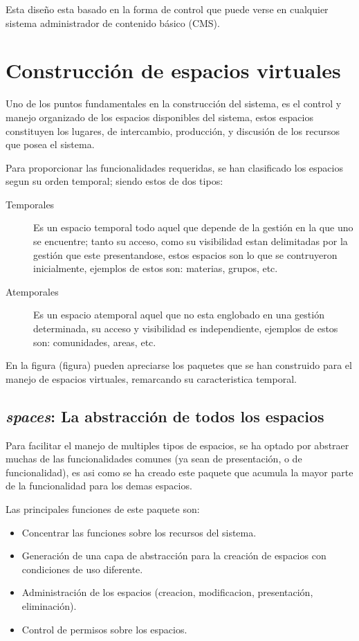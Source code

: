 Esta diseño esta basado en la forma de control que puede verse en cualquier
sistema administrador de contenido básico (CMS).

\section{Construcción de espacios virtuales}
Uno de los puntos fundamentales en la construcción del sistema, es el control y
manejo organizado de los espacios disponibles del sistema, estos espacios
constituyen los lugares, de intercambio, producción, y discusión de los
recursos que posea el sistema.

Para proporcionar las funcionalidades requeridas, se han clasificado los
espacios segun su orden temporal; siendo estos de dos tipos:

\begin{description}
\item [Temporales] Es un espacio temporal todo aquel que depende de la gestión
en la que uno se encuentre; tanto su acceso, como su visibilidad estan
delimitadas por la gestión que este presentandose, estos espacios son lo que se
contruyeron inicialmente, ejemplos de estos son: materias, grupos, etc.
\item [Atemporales] Es un espacio atemporal aquel que no esta englobado en una
gestión determinada, su acceso y visibilidad es independiente, ejemplos de
estos son: comunidades, areas, etc.
\end{description}

En la figura (figura) pueden apreciarse los paquetes que se han construido para
el manejo de espacios virtuales, remarcando su caracteristica temporal.

\subsection{\emph{spaces}: La abstracción de todos los espacios}
Para facilitar el manejo de multiples tipos de espacios, se ha optado por
abstraer muchas de las funcionalidades comunes (ya sean de presentación, o de
funcionalidad), es asi como se ha creado este paquete que acumula la mayor parte
de la funcionalidad para los demas espacios.

Las principales funciones de este paquete son:

\begin{itemize}
\item Concentrar las funciones sobre los recursos del sistema.
\item Generación de una capa de abstracción para la creación de espacios con
condiciones de uso diferente.
\item Administración de los espacios (creacion, modificacion, presentación,
eliminación).
\item Control de permisos sobre los espacios.
\end{itemize}

